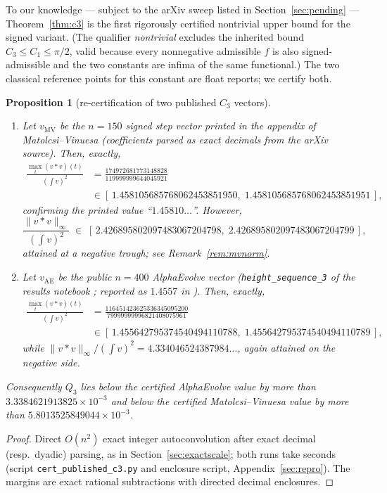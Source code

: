 \documentclass[11pt]{article}
\newtheorem{proposition}[theorem]{Proposition}
\theoremstyle{remark}
\newcommand{\supnorm}[1]{\lVert #1 \rVert_\infty}
\begin{document}
To our knowledge --- subject to the arXiv sweep listed in
Section~\ref{sec:pending} --- Theorem~\ref{thm:c3} is the first rigorously
certified nontrivial upper bound for the signed variant. (The qualifier
\emph{nontrivial} excludes the inherited bound $C_3 \le C_1 \le \pi/2$, valid
because every nonnegative admissible $f$ is also signed-admissible and the
two constants are infima of the same functional.) The two classical
reference points for this constant are float reports; we certify both.

\begin{proposition}[re-certification of two published $C_3$ vectors]
\label{prop:c3recert}
\begin{enumerate}
\item[(a)] Let $v_{\mathrm{MV}}$ be the $n=150$ signed step vector printed
in the appendix of Matolcsi--Vinuesa \cite{MV10} (coefficients parsed as
exact decimals from the arXiv source). Then, exactly,
\begin{align*}
\frac{\max_t (v*v)(t)}{(\int v)^2}
&= \frac{174972681773148828}{119999999644045921}\\
&\in [\,1.458105685768062453851950,\; 1.458105685768062453851951\,],
\end{align*}
confirming the printed value ``$1.45810\ldots$''. However,
\[
\frac{\supnorm{v * v}}{(\int v)^2} \;\in\;
[\,2.426895802097483067204798,\;2.426895802097483067204799\,],
\]
attained at a negative trough; see Remark~\ref{rem:mvnorm}.
\item[(b)] Let $v_{\mathrm{AE}}$ be the public $n=400$ AlphaEvolve vector
(\texttt{height\_sequence\_3} of the results notebook \cite{AEresults25};
reported as $1.4557$ in \cite{AlphaEvolve25,MathScale25}). Then, exactly,
\begin{align*}
\frac{\max_t (v*v)(t)}{(\int v)^2}
&= \frac{116451423625336345095200}{79999999996821408075961}\\
&\in [\,1.455642795374540494110788,\; 1.455642795374540494110789\,],
\end{align*}
while $\supnorm{v*v}/(\int v)^2 = 4.334046524387984\ldots$, again attained
on the negative side.
\end{enumerate}
Consequently $Q_3$ lies below the certified AlphaEvolve value by more than
$3.3384621913825\times10^{-3}$ and below the certified Matolcsi--Vinuesa
value by more than $5.8013525849044\times10^{-3}$.
\end{proposition}

\begin{proof}
Direct $O(n^2)$ exact integer autoconvolution after exact decimal
(resp.\ dyadic) parsing, as in Section~\ref{sec:exactscale}; both runs take
seconds (script \texttt{cert\_published\_c3.py} and enclosure script,
Appendix~\ref{sec:repro}). The margins are exact rational subtractions with
directed decimal enclosures.
\end{proof}
\end{document}
